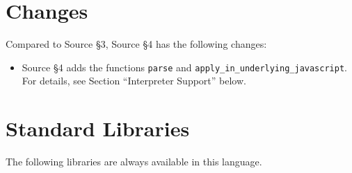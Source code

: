 





\section{Changes}

Compared to Source \S 3, Source \S 4 has the following changes:
\begin{itemize}
\item Source \S 4 adds the functions \lstinline{parse} and
\lstinline{apply_in_underlying_javascript}. 
For details, see 
Section ``Interpreter Support'' below.
\end{itemize}





\newpage





















\section{Standard Libraries}

The following libraries are always available in this language.















\newpage



\newpage



    
